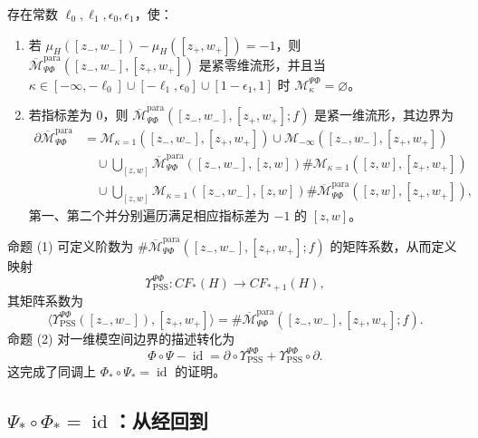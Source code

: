 \begin{proposition}
\label{prop:20-phi-psi-compactification}
存在常数 $\ell_0,\ell_1,\epsilon_0,\epsilon_1$，使：
\begin{enumerate}[label=(\arabic*)]
\item 若 $\mu_H([z_-,w_-])-\mu_H([z_+,w_+])=-1$，则
$\overline{\mathcal M}_{\Psi\Phi}^{\mathrm{para}}([z_-,w_-],[z_+,w_+])$
是紧零维流形，并且当
$\kappa\in[-\infty,-\ell_0]\cup[-\ell_1,\epsilon_0]\cup[1-\epsilon_1,1]$
时 $\mathcal M_\kappa^{\Psi\Phi}=\varnothing$。
\item 若指标差为 $0$，则
$\overline{\mathcal M}_{\Psi\Phi}^{\mathrm{para}}([z_-,w_-],[z_+,w_+];f)$
是紧一维流形，其边界为
\[
 \begin{aligned}
 \partial\overline{\mathcal M}_{\Psi\Phi}^{\mathrm{para}}
 &=\mathcal M_{\kappa=1}([z_-,w_-],[z_+,w_+])
 \cup\mathcal M_{-\infty}([z_-,w_-],[z_+,w_+])\\
 &\quad\cup\bigcup_{[z,w]}
 \overline{\mathcal M}_{\Psi\Phi}^{\mathrm{para}}([z_-,w_-],[z,w])
 \#\mathcal M_{\kappa=1}([z,w],[z_+,w_+])\\
 &\quad\cup\bigcup_{[z,w]}
 \mathcal M_{\kappa=1}([z_-,w_-],[z,w])
 \#\overline{\mathcal M}_{\Psi\Phi}^{\mathrm{para}}([z,w],[z_+,w_+]),
 \end{aligned}
\]
第一、第二个并分别遍历满足相应指标差为 $-1$ 的 $[z,w]$。
\end{enumerate}
\end{proposition}

命题 (1) 可定义阶数为
$\#\overline{\mathcal M}_{\Psi\Phi}^{\mathrm{para}}([z_-,w_-],[z_+,w_+];f)$
的矩阵系数，从而定义映射
\[
 \Upsilon_{\mathrm{PSS}}^{\Psi\Phi}:CF_*(H)\to CF_{*+1}(H),
\]
其矩阵系数为
\[
 \langle\Upsilon_{\mathrm{PSS}}^{\Psi\Phi}([z_-,w_-]),[z_+,w_+]\rangle
 =\#\overline{\mathcal M}_{\Psi\Phi}^{\mathrm{para}}([z_-,w_-],[z_+,w_+];f).
\]
命题 (2) 对一维模空间边界的描述转化为
\[
 \Phi\circ\Psi-\operatorname{id}
 =\partial\circ\Upsilon_{\mathrm{PSS}}^{\Psi\Phi}
 +\Upsilon_{\mathrm{PSS}}^{\Psi\Phi}\circ\partial.
\]
这完成了同调上 $\Phi_*\circ\Psi_*=\operatorname{id}$ 的证明。

\subsection{\texorpdfstring{$\Psi_*\circ\Phi_*=\operatorname{id}$}{Psi o Phi = id}：从\personMorse{}经\personFloer{}回到\personMorse{}}

